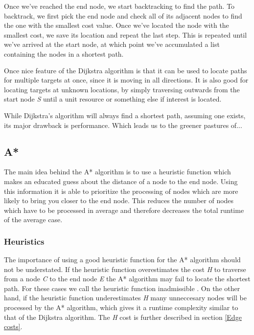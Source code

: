 \documentclass[12pt, a4paper]{article}
\begin{document}
Once we've reached the end node, we start backtracking to find the path. To backtrack, we first
pick the end node and check all of its adjacent nodes to find the one with the smallest cost value. Once we've
located the node with the smallest cost, we save its location and repeat the last step. This is repeated until we've arrived
at the start node, at which point we've accumulated a list containing the nodes in a shortest path.


Once nice feature of the Dijkstra algorithm is that it can be used to locate
paths for multiple targets at once, since it is moving in all directions. It is
also good for locating targets at unknown locations, by simply traversing
outwards from the start node \textit{S} until a unit resource or something else
if interest is located.

While Dijkstra's algorithm will always find a shortest path, assuming one exists, its
major drawback is performance. Which leads us to the greener pastures of...



\subsection{A*}


The main idea behind the A* algorithm is to use a heuristic function which makes
an educated guess about the distance of a node to the end node. Using this
information it is able to prioritize the processing of nodes which are more
likely to bring you closer to the end node. This reduces the number of nodes
which have to be processed in average and therefore decreases the total runtime
of the average case.


\subsubsection{Heuristics}
\label{Heuristics}

The importance of using a good heuristic function for the A* algorithm should
not be understated. If the heuristic function overestimates the cost \textit{H}
to traverse from a node \textit{C} to the end node \textit{E} the A* algorithm
may fail to locate the shortest path. For these cases we call the heuristic
function inadmissible \cite{astar2}. On the other hand, if the heuristic
function underestimates \textit{H} many unneccesary nodes will be processed by
the A* algorithm, which gives it a runtime complexity similar to that of the
Dijkstra algorithm. The \textit{H} cost is further described in section
\ref{Edge costs}.
\end{document}
